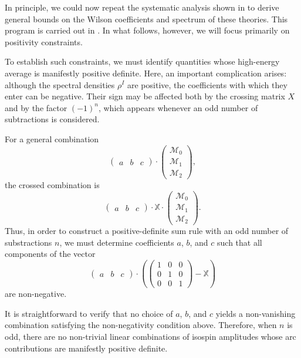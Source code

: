 In principle, we could now repeat the systematic analysis shown in  to derive general bounds on the Wilson coefficients and spectrum of these theories. This program is carried out in \autocite{Albert:2022oes}. In what follows, however, we will focus primarily on positivity constraints.

To establish such constraints, we must identify quantities whose high-energy average is manifestly positive definite. Here, an important complication arises: although the spectral densities $\rho^I$
are positive, the coefficients with which they enter  can be negative. Their sign may be affected both by the crossing matrix $X$ and by the factor $(-1)^n$, which appears whenever an odd number of subtractions is considered.

For a general combination
$$ \begin{pmatrix}
a & b & c 
\end{pmatrix} \cdot 
\begin{pmatrix}
    \mathcal{M}_0 \\
    \mathcal{M}_1 \\
    \mathcal{M}_2
\end{pmatrix},  $$
the crossed combination is 
$$ \begin{pmatrix}
a & b & c 
\end{pmatrix} \cdot \mathbb{X} \cdot
\begin{pmatrix}
    \mathcal{M}_0 \\
    \mathcal{M}_1 \\
    \mathcal{M}_2
\end{pmatrix}.  $$
Thus, in order to construct a positive-definite sum rule with an odd number of substractions $n$, we must determine coefficients $a$, $b$, and $c$ such that all components of the vector
\begin{equation}
    \begin{pmatrix}
        a & b & c
    \end{pmatrix}
    \cdot
    \left(
    \begin{pmatrix}
        1 & 0 & 0 \\
        0 & 1 & 0 \\
        0 & 0 & 1
    \end{pmatrix}
    - \mathbb{X}
    \right)
\end{equation}
are non-negative.

It is straightforward to verify that no choice of $a$, $b$, and $c$ yields a non-vanishing combination satisfying the non-negativity condition above. Therefore, when $n$ is odd, there are no non-trivial linear combinations of isospin amplitudes whose arc contributions are manifestly positive definite.

